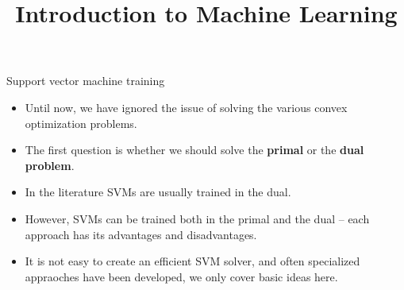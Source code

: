 




\newcommand{\titlefigure}{figure_man/SVM02.png}
\newcommand{\learninggoals}{
  \item Know that the SVM problem is not differentiable 
  \item Know how to optimize the SVM problem in the primal via subgradient descent
  \item Know how to optimize SVM in the dual formulation via pairwise coordinate ascent
}

\title{Introduction to Machine Learning}
\date{}




\sloppy 



\begin{vbframe}{Support vector machine training}

  \begin{itemize}
    \item Until now, we have ignored the issue of solving the
    various convex optimization problems.
    \item The first question is whether we should solve the \textbf{primal} or the \textbf{dual problem}.
    \item In the literature SVMs are usually trained in the dual.
    \item However, SVMs can be trained both in the primal and the dual -- each approach has its advantages and disadvantages.
    \item It is not easy to create an efficient SVM solver, and often specialized appraoches have been developed, 
      we only cover basic ideas here.
  \end{itemize}

\end{vbframe}

